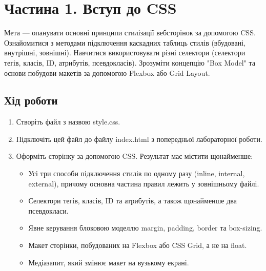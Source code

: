 \documentclass[12pt, a4paper]{article}
\begin{document}


\section{Частина 1. Вступ до CSS}
Мета --- опанувати основні принципи стилізації вебсторінок за допомогою CSS. Ознайомитися з методами підключення каскадних таблиць стилів (вбудовані, внутрішні, зовнішні). Навчитися використовувати різні селектори (селектори тегів, класів, ID, атрибутів, псевдокласів). Зрозуміти концепцію "Box Model" та основи побудови макетів за допомогою Flexbox або Grid Layout.
\subsection{Хід роботи}
\begin{enumerate}
	\item Створіть файл з назвою style.css.
	\item Підключіть цей файл до файлу index.html з попередньої лабораторної роботи.
	\item Оформіть сторінку за допомогою CSS. Результат має містити щонайменше:
		\begin{itemize}
			\item Усі три способи підключення стилів по одному разу (inline, internal, external), причому основна частина правил лежить у зовнішньому файлі.
			\item Селектори тегів, класів, ID та атрибутів, а також щонайменше два псевдокласи.
			\item Явне керування блоковою моделлю margin, padding, border та box-sizing.
			\item Макет сторінки, побудованих на Flexbox або CSS Grid, а не на float.
			\item Медіазапит, який змінює макет на вузькому екрані.
		\end{itemize}
\end{enumerate}
\end{document}
